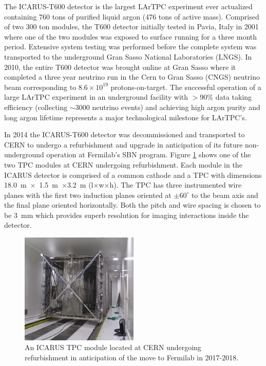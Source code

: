 The ICARUS-T600 detector is the largest LArTPC experiment ever actualized containing 760 tons of purified liquid argon (476 tons of active mass). Comprised of two 300 ton modules, the T600 detector initially tested in Pavia, Italy in 2001 where one of the two modules was exposed to surface running for a three month period. Extensive system testing was performed before the complete system was transported to the underground Gran Sasso National Laboratories (LNGS). In 2010, the entire T600 detector was brought online at Gran Sasso where it completed a three year neutrino run in the Cern to Gran Sasso (CNGS) neutrino beam corresponding to $8.6 \times 10^{19}$ protons-on-target. The successful operation of a large LArTPC experiment in an underground facility with $>90\%$ data taking efficiency (collecting $\sim$3000 neutrino events) and achieving high argon purity and long argon lifetime represents a major technological milestone for LArTPC's.

In 2014 the ICARUS-T600 detector was decommissioned and transported to CERN to undergo a refurbishment and upgrade in anticipation of its future non-underground operation at Fermilab's SBN program. Figure \ref{fig:ICARUSTPC} shows one of the two TPC modules at CERN undergoing refurbishment. Each module in the ICARUS detector is comprised of a common cathode and a TPC with dimensions 18.0~m~$\times$~1.5~m~$\times$3.2~m (l$\times$w$\times$h). The TPC has three instrumented wire planes with the first two induction planes oriented at $\pm 60^{\circ}$ to the beam axis and the final plane oriented horizontally. Both the pitch and wire spacing is chosen to be 3~mm which provides superb resolution for imaging interactions inside the detector. 

\begin{figure}[htb]
\centering
\includegraphics[width=0.50\textwidth]{images/ICARUSTPC.png}
\caption[]{An ICARUS TPC module located at CERN undergoing refurbishment in anticipation of the move to Fermilab in 2017-2018.}
\label{fig:ICARUSTPC}
\end{figure}

